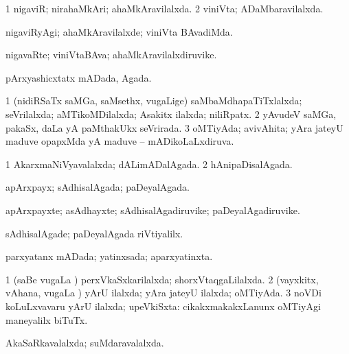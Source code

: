 \bentry
{} 
\gl{\gu}
\expl{}
\bmng
\bnum
\num{1} nigaviR; nirahaMkAri; ahaMkAravilalxda. 
\num{2} viniVta; ADaMbaravilalxda. 
\enum
\emng
\eentry

\bentry
{} 
\gl{\kirxvi}
\expl{}
\bmng
nigaviRyAgi; ahaMkAravilalxde; viniVta BAvadiMda. 
\emng
\eentry

\bentry
{} 
\gl{\nA}
\expl{}
\bmng
nigavaRte; viniVtaBAva; ahaMkAravilalxdiruvike. 
\emng
\eentry

\bentry
{} 
\gl{\gu}
\expl{}
\bmng
pArxyashicxtatx mADada, Agada. 
\emng
\eentry

\bentry
{} 
\gl{\gu}
\expl{}
\bmng
\bnum
\num{1} (nidiRSaTx saMGa, saMsethx, \mo vugaLige) saMbaMdhapaTiTxlalxda; seVrilalxda; aMTikoMDilalxda; Asakitx ilalxda; niliRpatx. 
\num{2} yAvudeV saMGa, pakaSx, daLa yA paMthakUkx seVrirada. 
\num{3} oMTiyAda; avivAhita; yAra jateyU maduve opapxMda yA maduve -- mADikoLaLxdiruva. 
\enum
\emng
\eentry

\bentry
{} 
\gl{\gu}
\expl{}
\bmng
\bnum
\num{1} AkarxmaNiVyavalalxda; dALimADalAgada. 
\num{2} hAnipaDisalAgada. 
\enum
\emng
\eentry

\bentry
{} 
\gl{\gu}
\expl{}
\bmng
apArxpayx; sAdhisalAgada; paDeyalAgada. 
\emng
\eentry

\bentry
{} 
\gl{\nA}
\expl{}
\bmng
apArxpayxte; asAdhayxte; sAdhisalAgadiruvike; paDeyalAgadiruvike. 
\emng
\eentry

\bentry
{} 
\gl{\kirxvi}
\expl{}
\bmng
sAdhisalAgade; paDeyalAgada riVtiyalilx. 
\emng
\eentry

\bentry
{} 
\gl{\gu}
\expl{}
\bmng
parxyatanx mADada; yatinxsada; aparxyatinxta. 
\emng
\eentry

\bentry
{} 
\gl{\gu}
\expl{}
\bmng
\bnum
\num{1} (saBe \mo vugaLa \vi) perxVkaSxkarilalxda; shorxVtaqgaLilalxda. 
\num{2} (vayxkitx, vAhana, \mo vugaLa \vi) yArU ilalxda; yAra jateyU ilalxda; oMTiyAda. 
\num{3} noVDi koLuLxvavaru yArU ilalxda; upeVkiSxta:  cikakxmakakxLanunx oMTiyAgi maneyalilx biTuTx. 
\enum
\emng
\eentry

\bentry
{} 
\gl{\gu}
\expl{}
\bmng
AkaSaRkavalalxda; suMdaravalalxda. 
\emng
\eentry

